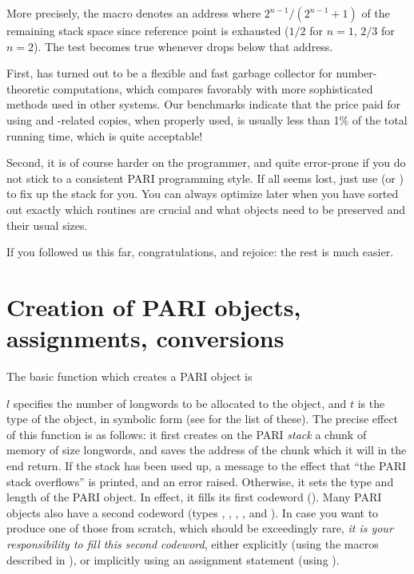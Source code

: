 More precisely, the macro  denotes an address
where $2^{n-1} / (2^{n-1}+1)$ of the remaining stack space since reference
point  is exhausted ($1/2$ for $n=1$, $2/3$ for $n=2$). The test
 becomes true whenever  drops below
that address.


First,  has turned out to be a flexible and fast garbage
collector for number-theoretic computations, which compares favorably with
more sophisticated methods used in other systems. Our benchmarks indicate
that the price paid for using  and -related
copies, when properly used, is usually less than 1\% of the total
running time, which is quite acceptable!

Second, it is of course harder on the programmer, and quite error-prone
if you do not stick to a consistent PARI programming style. If all seems
lost, just use  (or ) to fix up the stack
for you. You can always optimize later when you have sorted out exactly which
routines are crucial and what objects need to be preserved and their usual
sizes.

\smallskip If you followed us this far, congratulations, and rejoice: the
rest is much easier.

\section{Creation of PARI objects, assignments, conversions}

The basic function which creates a PARI object is

$l$ specifies the number of longwords to be allocated to the
object, and $t$ is the type of the object, in symbolic
form (see  for the list of these). The precise effect of
this function is as follows: it first creates on the PARI \emph{stack} a
chunk of memory of size  longwords, and saves the address of the
chunk which it will in the end return. If the stack has been used up, a
message to the effect that ``the PARI stack overflows'' is printed,
and an error raised. Otherwise, it sets the type and length of the PARI object.
In effect, it fills its first codeword (). Many PARI
objects also have a second codeword (types , ,
, , and ). In case you want to produce one of
those from scratch, which should be exceedingly rare, \emph{it is your
responsibility to fill this second codeword}, either explicitly (using the
macros described in ), or implicitly using an assignment
statement (using ).

